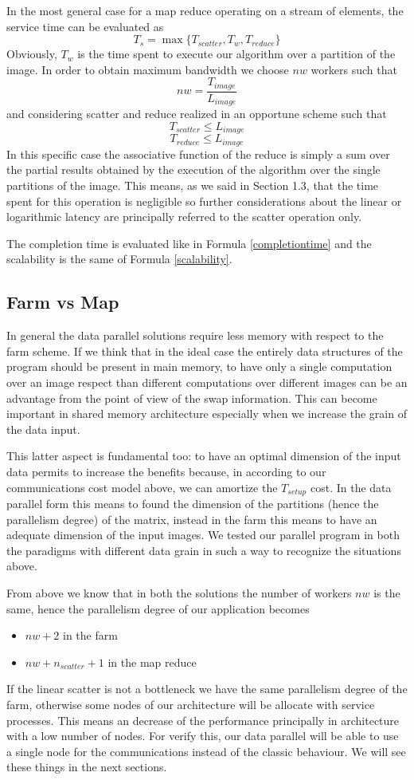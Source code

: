 In the most general case for a map reduce operating on a stream of elements, the service time can be evaluated as
\[
T_{s} = \max\lbrace T_{scatter}, T_{w}, T_{reduce}\rbrace
\] 
Obviously, $T_{w}$ is the time spent to execute our algorithm over a partition of the image. 
In order to obtain maximum bandwidth we choose $nw$ workers such that
\[
nw = \frac{T_{image}}{L_{image}}
\]
and considering scatter and reduce realized in an opportune scheme such that
\[
T_{scatter} \leq L_{image}
\]
\[
T_{reduce} \leq L_{image}
\] 
In this specific case the associative function of the reduce is simply a sum over the partial results obtained by the execution of the algorithm over the single partitions of the image. 
This means, as we said in Section 1.3, that the time spent for this operation is negligible so further considerations about the linear or logarithmic latency are principally referred to the scatter operation only.

The completion time is evaluated like in Formula \ref{completiontime} and the scalability is the same of Formula \ref{scalability}.

\subsection{Farm vs Map}

In general the data parallel solutions require less memory with respect to the farm scheme. 
If we think that in the ideal case the entirely data structures of the program should be present in main memory, to have only a single computation over an image respect than different computations over different images can be an advantage from the point of view of the swap information. This can become important in shared memory architecture especially when we increase the grain of the data input.

This latter aspect is fundamental too: to have an optimal dimension of the input data permits to increase the benefits because, in according to our communications cost model above, we can amortize the $T_{setup}$ cost. In the data parallel form this means to found the dimension of the partitions (hence the parallelism degree) of the matrix, instead in the farm this means to have an adequate dimension of the input images. We tested our parallel program in both the paradigms with different data grain in such a way to recognize the situations above.

From above we know that in both the solutions the number of workers $nw$ is the same, hence the parallelism degree of our application becomes
\begin{itemize}
\item $nw+2$ in the farm
\item $nw+n_{scatter}+1$ in the map reduce
\end{itemize}
If the linear scatter is not a bottleneck we have the same parallelism degree of the farm, otherwise some nodes of our architecture will be allocate with service processes. This means an decrease of the performance principally in architecture with a low number of nodes. For verify this, our data parallel will be able to use a single node for the communications instead of the classic behaviour. We will see these things in the next sections.